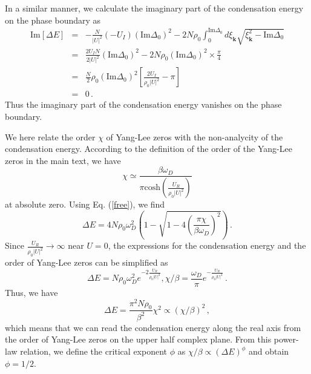 \documentclass[aps,onecolumn,nofootinbib,superscriptaddress,notitlepage,longbibliography]{revtex4-1}
\begin{document}
In a similar manner, we calculate the imaginary part of the condensation energy on the phase boundary as
\begin{eqnarray}
  \text{Im} [\Delta E] & = & - \frac{N}{| U |^2} \left( - U_I \right)
  \left( \text{Im} \Delta_0 \right)^2 - 2 N \rho_0 \int_0^{\text{Im} \Delta_0}
  d \xi_{\bm{k}} \sqrt{\xi_{\bm{k}}^2 - \text{Im} \Delta_0} \nonumber\\
  & = & \frac{2U_I N}{2 | U |^2} \left( \text{Im} \Delta_0 \right)^2 - 2 N
  \rho_0 \left( \text{Im} \Delta_0 \right)^2 \times \frac{\pi}{4} \nonumber\\
  & = & \frac{N}{2} \rho_0 \left( \text{Im} \Delta_0 \right)^2 \left[
  \frac{2U_I}{\rho_0 | U |^2} - \pi \right] \nonumber\\
  & = & 0 \,.
\end{eqnarray}
Thus the imaginary part of the condensation energy vanishes on the phase boundary. 

We here relate the order $\chi$ of Yang-Lee zeros with the non-analycity of the condensation energy. According to the definition of the order of the Yang-Lee zeros in the main text, we have
\begin{equation}
    \chi\simeq\frac{\beta\omega_D}{\pi\text{cosh}(\frac{U_R}{\rho_0|U|^2})}
\end{equation}
at absolute zero. Using Eq. (\ref{free}), we find
\begin{equation}
    \Delta E=4N\rho_0\omega_D^2(1-\sqrt{1-4(\frac{\pi\chi}{\beta\omega_D})^2})\,.
\end{equation}
Since $\frac{U_R}{\rho_0|U|^2}\rightarrow\infty$ near $U=0$, the expressions for the condensation energy and the order of Yang-Lee zeros can be simplified as
\begin{equation}
    \Delta E=N \rho_0 \omega_D^2 e^{-2\frac{U_R}{\rho_0|U|^2}},\chi/\beta=\frac{\omega_D}{\pi}e^{-\frac{U_R}{\rho_0|U|^2}}\,.
\end{equation}
Thus, we have
\begin{equation}
    \Delta E=\frac{\pi^2N\rho_0}{\beta^2}\chi^2\propto(\chi/\beta)^2\,,
\end{equation}
which means that we can read the condensation energy along the real axis from the order of Yang-Lee zeros on the upper half complex plane. From this power-law relation, we define the critical exponent $\phi$ as $\chi/\beta\propto(\Delta E)^{\phi}$ and obtain $\phi=1/2$.
\end{document}
